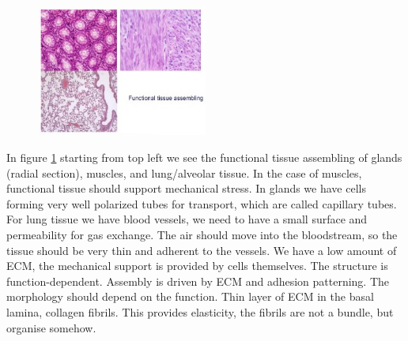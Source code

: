 \begin{figure}[h]
\includegraphics[width=0.5\textwidth, center]{functionaltissue}
\caption{\label{fig:funtis}}
\end{figure}

In figure \ref{fig:funtis} starting from top left we see the functional tissue assembling of glands (radial section), muscles, and lung/alveolar tissue. In the case of muscles, functional tissue should support mechanical stress. In glands we have cells forming very well polarized tubes for transport, which are called capillary tubes. For lung tissue we have blood vessels, we need to have a small surface and permeability for gas exchange. The air should move into the bloodstream,  so the tissue should be very thin and adherent to the vessels. We have a low amount of ECM, the mechanical support is provided by cells themselves. The structure is function-dependent. 
Assembly is driven by ECM and adhesion patterning. The morphology should depend on the function. Thin layer of ECM in the basal lamina, collagen fibrils. This provides elasticity, the fibrils are not a bundle, but organise somehow.


